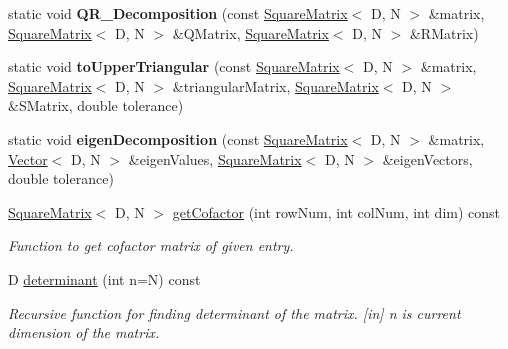 \begin{DoxyItemize}
\item 
\end{DoxyItemize}\begin{DoxyCompactItemize}
\item 
\mbox{\label{classrev_1_1_square_matrix_a959b686ab50fe6bb69d5c5cefea96faa}} 
static void {\bfseries Q\+R\+\_\+\+Decomposition} (const \mbox{\hyperlink{classrev_1_1_square_matrix}{Square\+Matrix}}$<$ D, N $>$ \&matrix, \mbox{\hyperlink{classrev_1_1_square_matrix}{Square\+Matrix}}$<$ D, N $>$ \&Q\+Matrix, \mbox{\hyperlink{classrev_1_1_square_matrix}{Square\+Matrix}}$<$ D, N $>$ \&R\+Matrix)
\item 
\mbox{\label{classrev_1_1_square_matrix_a4fe52d42edc9a2f09efd64041ddda2c3}} 
static void {\bfseries to\+Upper\+Triangular} (const \mbox{\hyperlink{classrev_1_1_square_matrix}{Square\+Matrix}}$<$ D, N $>$ \&matrix, \mbox{\hyperlink{classrev_1_1_square_matrix}{Square\+Matrix}}$<$ D, N $>$ \&triangular\+Matrix, \mbox{\hyperlink{classrev_1_1_square_matrix}{Square\+Matrix}}$<$ D, N $>$ \&S\+Matrix, double tolerance)
\item 
\mbox{\label{classrev_1_1_square_matrix_acb3af0375520546dac53f6bf7ad1f086}} 
static void {\bfseries eigen\+Decomposition} (const \mbox{\hyperlink{classrev_1_1_square_matrix}{Square\+Matrix}}$<$ D, N $>$ \&matrix, \mbox{\hyperlink{classrev_1_1_vector}{Vector}}$<$ D, N $>$ \&eigen\+Values, \mbox{\hyperlink{classrev_1_1_square_matrix}{Square\+Matrix}}$<$ D, N $>$ \&eigen\+Vectors, double tolerance)
\item 
\mbox{\hyperlink{classrev_1_1_square_matrix}{Square\+Matrix}}$<$ D, N $>$ \mbox{\hyperlink{classrev_1_1_square_matrix_a204e6e236994f6fa470a8fac499071b6}{get\+Cofactor}} (int row\+Num, int col\+Num, int dim) const
\begin{DoxyCompactList}\small\item\em Function to get cofactor matrix of given entry. \end{DoxyCompactList}\item 
D \mbox{\hyperlink{classrev_1_1_square_matrix_a1b8f1c482c9861c180f0b3d8559721c9}{determinant}} (int n=N) const
\begin{DoxyCompactList}\small\item\em Recursive function for finding determinant of the matrix. \mbox{[}in\mbox{]} n is current dimension of the matrix. \end{DoxyCompactList}\item 

\end{DoxyCompactItemize}
